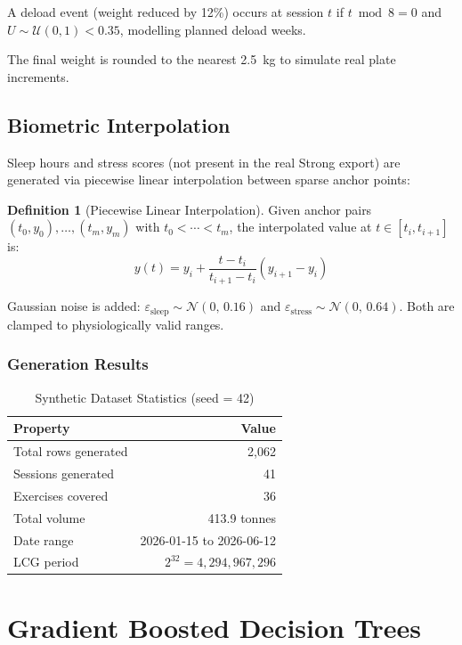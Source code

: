 \documentclass[12pt,a4paper]{report}
\theoremstyle{definition}
\newtheorem{definition}{Definition}[chapter]
\begin{document}
A deload event (weight reduced by 12\%) occurs at session $t$ if
$t \bmod 8 = 0$ and $U \sim \mathcal{U}(0,1) < 0.35$, modelling planned
deload weeks.

The final weight is rounded to the nearest 2.5~kg to simulate real plate increments.

\section{Biometric Interpolation}

Sleep hours and stress scores (not present in the real Strong export) are
generated via piecewise linear interpolation between sparse anchor points:

\begin{definition}[Piecewise Linear Interpolation]
Given anchor pairs $(t_0, y_0), \ldots, (t_m, y_m)$ with $t_0 < \cdots < t_m$,
the interpolated value at $t \in [t_i, t_{i+1}]$ is:
\[
  y(t) = y_i + \frac{t - t_i}{t_{i+1} - t_i}(y_{i+1} - y_i)
\]
\end{definition}

Gaussian noise is added: $\varepsilon_{\text{sleep}} \sim \mathcal{N}(0,\,0.16)$
and $\varepsilon_{\text{stress}} \sim \mathcal{N}(0,\,0.64)$. Both are clamped to
physiologically valid ranges.

\subsection{Generation Results}

\begin{table}[h!]
\centering
\caption{Synthetic Dataset Statistics (seed = 42)}
\begin{tabular}{lr}
\toprule
\textbf{Property} & \textbf{Value} \\
\midrule
Total rows generated   & 2{,}062 \\
Sessions generated     & 41 \\
Exercises covered      & 36 \\
Total volume           & 413.9 tonnes \\
Date range             & 2026-01-15 to 2026-06-12 \\
LCG period             & $2^{32} = 4{,}294{,}967{,}296$ \\
\bottomrule
\end{tabular}
\end{table}

\chapter{Gradient Boosted Decision Trees}
\end{document}
